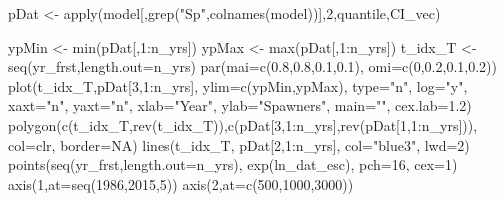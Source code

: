 \documentclass[
  11pt,
]{article}
\newenvironment{Shaded}{}{}
\newcommand{\DataTypeTok}[1]{#1}
\newcommand{\DecValTok}[1]{#1}
\newcommand{\FloatTok}[1]{#1}
\newcommand{\KeywordTok}[1]{\textcolor[rgb]{0.00,0.00,1.00}{#1}}
\newcommand{\NormalTok}[1]{#1}
\newcommand{\OperatorTok}[1]{#1}
\newcommand{\OtherTok}[1]{\textcolor[rgb]{1.00,0.25,0.00}{#1}}
\newcommand{\StringTok}[1]{\textcolor[rgb]{0.00,0.50,0.50}{#1}}
\begin{document}
\begin{Shaded}
\begin{Highlighting}[]
\NormalTok{pDat <-}\StringTok{ }\KeywordTok{apply}\NormalTok{(model[,}\KeywordTok{grep}\NormalTok{(}\StringTok{"Sp"}\NormalTok{,}\KeywordTok{colnames}\NormalTok{(model))],}\DecValTok{2}\NormalTok{,quantile,CI_vec)}

\NormalTok{ypMin <-}\StringTok{ }\KeywordTok{min}\NormalTok{(pDat[,}\DecValTok{1}\OperatorTok{:}\NormalTok{n_yrs])}
\NormalTok{ypMax <-}\StringTok{ }\KeywordTok{max}\NormalTok{(pDat[,}\DecValTok{1}\OperatorTok{:}\NormalTok{n_yrs])}
\NormalTok{t_idx_T <-}\StringTok{ }\KeywordTok{seq}\NormalTok{(yr_frst,}\DataTypeTok{length.out=}\NormalTok{n_yrs)}
\KeywordTok{par}\NormalTok{(}\DataTypeTok{mai=}\KeywordTok{c}\NormalTok{(}\FloatTok{0.8}\NormalTok{,}\FloatTok{0.8}\NormalTok{,}\FloatTok{0.1}\NormalTok{,}\FloatTok{0.1}\NormalTok{), }\DataTypeTok{omi=}\KeywordTok{c}\NormalTok{(}\DecValTok{0}\NormalTok{,}\FloatTok{0.2}\NormalTok{,}\FloatTok{0.1}\NormalTok{,}\FloatTok{0.2}\NormalTok{))}
\KeywordTok{plot}\NormalTok{(t_idx_T,pDat[}\DecValTok{3}\NormalTok{,}\DecValTok{1}\OperatorTok{:}\NormalTok{n_yrs], }\DataTypeTok{ylim=}\KeywordTok{c}\NormalTok{(ypMin,ypMax), }\DataTypeTok{type=}\StringTok{"n"}\NormalTok{, }\DataTypeTok{log=}\StringTok{"y"}\NormalTok{, }\DataTypeTok{xaxt=}\StringTok{"n"}\NormalTok{, }\DataTypeTok{yaxt=}\StringTok{"n"}\NormalTok{,}
     \DataTypeTok{xlab=}\StringTok{"Year"}\NormalTok{, }\DataTypeTok{ylab=}\StringTok{"Spawners"}\NormalTok{, }\DataTypeTok{main=}\StringTok{""}\NormalTok{, }\DataTypeTok{cex.lab=}\FloatTok{1.2}\NormalTok{)}
\KeywordTok{polygon}\NormalTok{(}\KeywordTok{c}\NormalTok{(t_idx_T,}\KeywordTok{rev}\NormalTok{(t_idx_T)),}\KeywordTok{c}\NormalTok{(pDat[}\DecValTok{3}\NormalTok{,}\DecValTok{1}\OperatorTok{:}\NormalTok{n_yrs],}\KeywordTok{rev}\NormalTok{(pDat[}\DecValTok{1}\NormalTok{,}\DecValTok{1}\OperatorTok{:}\NormalTok{n_yrs])), }\DataTypeTok{col=}\NormalTok{clr, }\DataTypeTok{border=}\OtherTok{NA}\NormalTok{)}
\KeywordTok{lines}\NormalTok{(t_idx_T, pDat[}\DecValTok{2}\NormalTok{,}\DecValTok{1}\OperatorTok{:}\NormalTok{n_yrs], }\DataTypeTok{col=}\StringTok{"blue3"}\NormalTok{, }\DataTypeTok{lwd=}\DecValTok{2}\NormalTok{)}
\KeywordTok{points}\NormalTok{(}\KeywordTok{seq}\NormalTok{(yr_frst,}\DataTypeTok{length.out=}\NormalTok{n_yrs), }\KeywordTok{exp}\NormalTok{(ln_dat_esc), }\DataTypeTok{pch=}\DecValTok{16}\NormalTok{, }\DataTypeTok{cex=}\DecValTok{1}\NormalTok{)}
\KeywordTok{axis}\NormalTok{(}\DecValTok{1}\NormalTok{,}\DataTypeTok{at=}\KeywordTok{seq}\NormalTok{(}\DecValTok{1986}\NormalTok{,}\DecValTok{2015}\NormalTok{,}\DecValTok{5}\NormalTok{))}
\KeywordTok{axis}\NormalTok{(}\DecValTok{2}\NormalTok{,}\DataTypeTok{at=}\KeywordTok{c}\NormalTok{(}\DecValTok{500}\NormalTok{,}\DecValTok{1000}\NormalTok{,}\DecValTok{3000}\NormalTok{))}
\end{Highlighting}
\end{Shaded}
\end{document}
